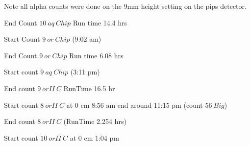 \documentclass[idxtotoc,hyperref,openany,oneside]{labbook} %
\newcommand{\cmark}{\ding{51}}%
\newcommand{\done}{\rlap{$\square$}{\raisebox{2pt}{\large\hspace{1pt}\cmark}}%
  \hspace{-2.5pt}}
\begin{document}




Note all alpha counts were done on the 9mm height setting
on the pips detector.
\begin{todolist}
\item[\done]{End Count $\boxed{10\ aq\ Chip}$ Run time 14.4 hrs}
\item[\done]{Start Count $\boxed{9\ or\ Chip}$ (9:02 am)}
\item[\done]{End Count $\boxed{9\ or\ Chip}$ Run time 6.08 hrs}
\item[\done]{Start count $\boxed{9\ aq\ Chip}$ (3:11 pm)}
\end{todolist}




\begin{todolist}
\item[\done]{End count $\boxed{9\ orII\ C}$ RunTime 16.5 hr}
\item[\done]{Start count $\boxed{8\ orII\ C}$ at 0 cm 8:56 am
             end around 11:15 pm (count  $\boxed{56\ Big}$)}
\item[\done]{End count $\boxed{8\ orII\ C}$ (RunTime 2.254 hrs)}
\item[\done]{Start count $\boxed{10\ orII\ C}$ at 0 cm 1:04 pm}
\end{todolist}
\end{document}
